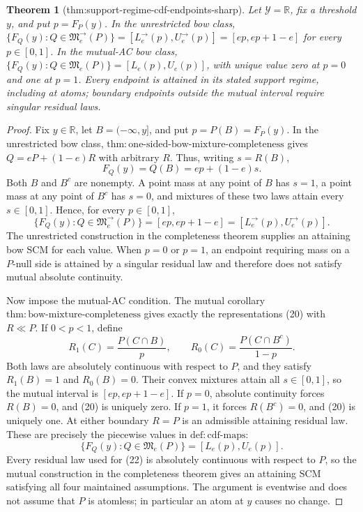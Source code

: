 \documentclass{article}
\newtheorem{theorem}{Theorem}
\begin{document}
\begin{theorem}[thm:support-regime-cdf-endpoints-sharp]\label{thm:support-regime-cdf-endpoints-sharp}
Let \(\mathcal Y=\mathbb R\), fix a threshold \(y\), and put \(p=F_P(y)\). In the unrestricted bow class, \(\{F_Q(y):Q\in\mathfrak M^{\to}_e(P)\}=[L^{\to}_e(p),U^{\to}_e(p)]=[ep,ep+1-e]\) for every \(p\in[0,1]\). In the mutual-AC bow class, \(\{F_Q(y):Q\in\mathfrak M_e(P)\}=[L_e(p),U_e(p)]\), with unique value zero at \(p=0\) and one at \(p=1\). Every endpoint is attained in its stated support regime, including at atoms; boundary endpoints outside the mutual interval require singular residual laws.
\end{theorem}
\begin{proof}
Fix \(y\in\mathbb R\), let \(B=(-\infty,y]\), and put \(p=P(B)=F_P(y)\).  In the unrestricted bow class, \(\mathrm{thm:one\text{-}sided\text{-}bow\text{-}mixture\text{-}completeness}\) gives \(Q=eP+(1-e)R\) with arbitrary \(R\).  Thus, writing \(s=R(B)\),
\[
 F_Q(y)=Q(B)=ep+(1-e)s. \tag{20}
\]
Both \(B\) and \(B^c\) are nonempty.  A point mass at any point of \(B\) has \(s=1\), a point mass at any point of \(B^c\) has \(s=0\), and mixtures of these two laws attain every \(s\in[0,1]\).  Hence, for every \(p\in[0,1]\),
\[
 \{F_Q(y):Q\in\mathfrak M^{\to}_e(P)\}
 =[ep,ep+1-e]=[L^{\to}_e(p),U^{\to}_e(p)]. \tag{21}
\]
The unrestricted construction in the completeness theorem supplies an attaining bow SCM for each value.  When \(p=0\) or \(p=1\), an endpoint requiring mass on a \(P\)-null side is attained by a singular residual law and therefore does not satisfy mutual absolute continuity.

Now impose the mutual-AC condition.  The mutual corollary \(\mathrm{thm:bow\text{-}mixture\text{-}completeness}\) gives exactly the representations (20) with \(R\ll P\).  If \(0<p<1\), define
\[
 R_1(C)=\frac{P(C\cap B)}p,
 \qquad
 R_0(C)=\frac{P(C\cap B^c)}{1-p}.
\]
Both laws are absolutely continuous with respect to \(P\), and they satisfy \(R_1(B)=1\) and \(R_0(B)=0\).  Their convex mixtures attain all \(s\in[0,1]\), so the mutual interval is \([ep,ep+1-e]\).  If \(p=0\), absolute continuity forces \(R(B)=0\), and (20) is uniquely zero.  If \(p=1\), it forces \(R(B^c)=0\), and (20) is uniquely one.  At either boundary \(R=P\) is an admissible attaining residual law.  These are precisely the piecewise values in \(\mathrm{def:cdf\text{-}maps}\):
\[
 \{F_Q(y):Q\in\mathfrak M_e(P)\}=[L_e(p),U_e(p)]. \tag{22}
\]
Every residual law used for (22) is absolutely continuous with respect to \(P\), so the mutual construction in the completeness theorem gives an attaining SCM satisfying all four maintained assumptions.  The argument is eventwise and does not assume that \(P\) is atomless; in particular an atom at \(y\) causes no change.
\end{proof}
\end{document}
